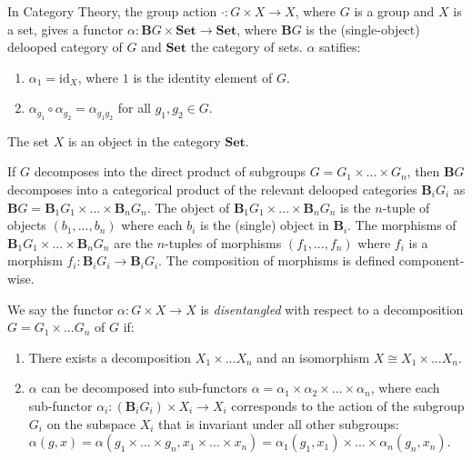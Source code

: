 In Category Theory, the group action $\cdot: G \times X \to X$, where $G$ is a group and $X$ is a set, gives a functor $\alpha: \textbf{B}G \times \textbf{Set} \to \textbf{Set}$, where $\textbf{B}G$ is the (single-object) delooped category of $G$ and $\textbf{Set}$ the category of sets.
$\alpha$ satifies:
\begin{enumerate}
    \item $\alpha_{1} = \text{id}_{X}$, where $1$ is the identity element of $G$.
    \item $\alpha_{g_{1}} \circ \alpha_{g_{2}} = \alpha_{g_{1}g_{2}}$ for all $g_{1}, g_{2} \in G$.
\end{enumerate}
The set $X$ is an object in the category $\textbf{Set}$.

If $G$ decomposes into the direct product of subgroups $G = G_{1} \times ... \times G_{n}$, then $\textbf{B}G$ decomposes into a categorical product of the relevant delooped categories $\textbf{B}_{i}G_{i}$ as $\textbf{B}G = \textbf{B}_{1}G_{1} \times ... \times \textbf{B}_{n}G_{n}$.
The object of $\textbf{B}_{1}G_{1} \times ... \times \textbf{B}_{n}G_{n}$ is the $n$-tuple of objects $(b_{1},...,b_{n})$ where each $b_{i}$ is the (single) object in $\textbf{B}_{i}$.
The morphisms of $\textbf{B}_{1}G_{1} \times ... \times \textbf{B}_{n}G_{n}$ are the $n$-tuples of morphisms $(f_{1}, ..., f_{n})$ where $f_{i}$ is a morphism $f_{i}: \textbf{B}_{i}G_{i} \to \textbf{B}_{i}G_{i}$.
The composition of morphisms is defined component-wise.

We say the functor $\alpha: G \times X \to X$ is \textit{disentangled} with respect to a decomposition $G = G_{1} \times ... G_{n}$ of $G$ if:
\begin{enumerate}
    \item There exists a decomposition $X_{1} \times ... X_{n}$ and an isomorphism $X \cong X_{1} \times ... X_{n}$.

    \item $\alpha$ can be decomposed into sub-functors $\alpha = \alpha_{1} \times \alpha_{2} \times ... \times \alpha_{n}$, where each sub-functor $\alpha_{i}: (\textbf{B}_{i}G_{i}) \times X_{i} \to X_{i}$ corresponds to the action of the subgroup $G_{i}$ on the subspace $X_{i}$ that is invariant under all other subgroups: $\alpha(g, x) = \alpha(g_{1} \times ... \times g_{n}, x_{1} \times ... \times x_{n}) = \alpha_{1}(g_{1}, x_{1}) \times ... \times \alpha_{n}(g_{n}, x_{n})$.
\end{enumerate}

